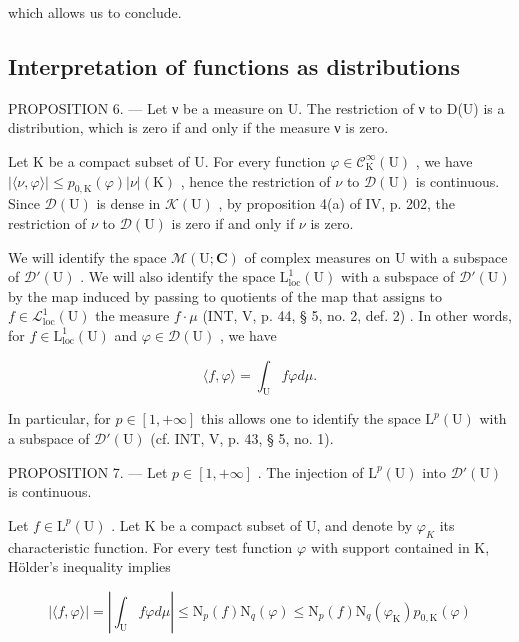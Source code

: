 which allows us to conclude.

\subsection{Interpretation of functions as distributions}

PROPOSITION 6. --- Let ν be a measure on U. The restriction of ν to D(U) is a distribution, which is zero if and only if the measure ν is zero.

Let K be a compact subset of U. For every function \(\varphi\in\mathcal{C}_{\mathrm{K}}^{\infty}(\mathrm{U})\) , we have \(|\langle\nu,\varphi\rangle|\leqslant p_{0,\mathrm{K}}(\varphi)|\nu|(\mathrm{K})\) , hence the restriction of \(\nu\) to \(\mathcal{D}(\mathrm{U})\) is continuous. Since \(\mathcal{D}(\mathrm{U})\) is dense in \(\mathcal{K}(\mathrm{U})\) , by proposition 4(a) of IV, p. 202, the restriction of \(\nu\) to \(\mathcal{D}(\mathrm{U})\) is zero if and only if \(\nu\) is zero.

We will identify the space \(\mathcal{M}(\mathrm{U};\mathbf{C})\) of complex measures on U with a subspace of \(\mathcal{D}'(\mathrm{U})\) . We will also identify the space \(\mathrm{L}_{\mathrm{loc}}^{1}(\mathrm{U})\) with a subspace of \(\mathcal{D}'(\mathrm{U})\) by the map induced by passing to quotients of the map that assigns to \(f\in \mathcal{L}_{\mathrm{loc}}^{1}(\mathrm{U})\) the measure \(f\cdot \mu\) (INT, V, p. 44, § 5, no. 2, def. 2) . In other words, for \(f\in \mathrm{L}_{\mathrm{loc}}^{1}(\mathrm{U})\) and \(\varphi \in \mathcal{D}(\mathrm{U})\) , we have

\[
\langle f, \varphi \rangle = \int_ {\mathrm{U}} f \varphi d \mu .
\]

In particular, for \(p \in [1, +\infty]\) this allows one to identify the space \(\mathrm{L}^p(\mathrm{U})\) with a subspace of \(\mathcal{D}'(\mathrm{U})\) (cf. INT, V, p. 43, § 5, no. 1).

PROPOSITION 7. --- Let \(p \in [1, +\infty]\) . The injection of \(\mathrm{L}^p(\mathrm{U})\) into \(\mathcal{D}'(\mathrm{U})\) is continuous.

Let \(f \in \mathrm{L}^{p}(\mathrm{U})\) . Let K be a compact subset of U, and denote by \(\varphi_{K}\) its characteristic function. For every test function \(\varphi\) with support contained in K, Hölder's inequality implies

\[
| \langle f, \varphi \rangle | = \left| \int_ {\mathrm{U}} f \varphi d \mu \right| \leqslant \mathrm{N} _ {p} (f) \mathrm{N} _ {q} (\varphi) \leqslant \mathrm{N} _ {p} (f) \mathrm{N} _ {q} (\varphi_ {\mathrm{K}}) p _ {0, \mathrm{K}} (\varphi)
\]

